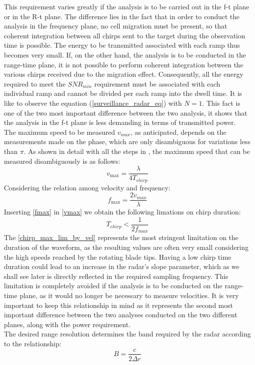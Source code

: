 This requirement varies greatly if the analysis is to be carried out in the f-t plane or in the R-t plane. The difference lies in the fact that in order to conduct the analysis in the frequency plane, no cell migration must be present, so that coherent integration between all chirps sent to the target during the observation time is possible. The energy to be transmitted associated with each ramp thus becomes very small. If, on the other hand, the analysis is to be conducted in the range-time plane, it is not possible to perform coherent integration between the various chirps received due to the migration effect. Consequently, all the energy required to meet the $SNR_{min}$ requirement must be associated with each individual ramp and cannot be divided per each ramp into the dwell time. It is like to observe the equation (\ref{surveillance_radar_eq}) with $N=1$. This fact is one of the two most important difference between the two analysis, it shows that the analysis in the f-t plane is less demanding in terms of transmitted power. \\
The maximum speed to be measured $v_{max}$, as anticipated, depends on the measurements made on the phase, which are only disambiguous for variations less than $\pi$. As shown in detail with all the steps in \cite{2Dprocessing_fmcw}, the maximum speed that can be measured disambiguously is as follows:
\begin{equation}
v_{\max }=\frac{\lambda}{4 T_{chirp}}
\label{vmax}
\end{equation}
Considering the relation among velocity and frequency:
\begin{equation}
f_{\max }=\frac{2 v_{max}}{\lambda}
\label{fmax}
\end{equation}
Inserting \ref{fmax} in \ref{vmax} we obtain the following limations on chirp duration:
\begin{equation}
T_{chirp}<\frac{1}{2 f_{max}}
\label{chirp_max_lim_by_vel}
\end{equation}
The \ref{chirp_max_lim_by_vel} represents the most stringent limitation on the duration of the waveform, as the resulting values are often very small considering the high speeds reached by the rotating blade tips. Having a low chirp time duration could lead to an increase in the radar's slope parameter, which as we shall see later is directly reflected in the required sampling frequency. This limitation is completely avoided if the analysis is to be conducted on the range-time plane, as it would no longer be necessary to measure velocities. It is very important to keep this relationship in mind as it represents the second most important difference between the two analyses conducted on the two different planes, along with the power requirement.\\
The desired range resolution determines the band required by the radar according to the relationship:
\begin{equation}
B=\frac{c}{2 \Delta r}
\end{equation}

